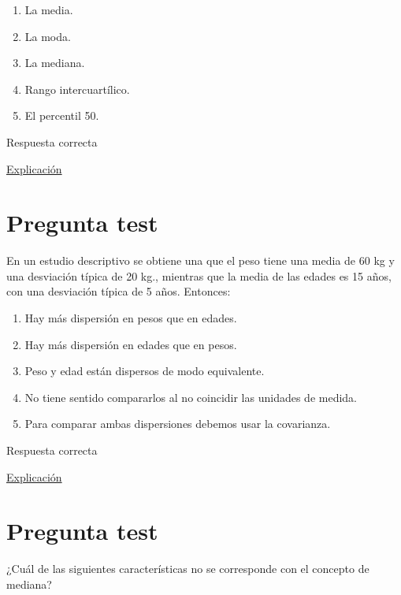 \documentclass[
]{book}
\providecommand{\tightlist}{%
  \setlength{\itemsep}{0pt}\setlength{\parskip}{0pt}}
\begin{document}
\begin{enumerate}
\def\labelenumi{\alph{enumi})}
\tightlist
\item
  La media.
\item
  La moda.
\item
  La mediana.
\item
  Rango intercuartílico.
\item
  El percentil 50.
\end{enumerate}

Respuesta correcta

\href{https://1fjmanzano.github.io/bioestadistica/medidas-de-posicio\%CC\%81n-dispersio\%CC\%81n-y-forma.html\#medidas-de-posicio\%CC\%81n-centrales}{Explicación}

\hypertarget{pregunta-test-52}{%
\section{Pregunta test}\label{pregunta-test-52}}

En un estudio descriptivo se obtiene una que el peso tiene una media de 60 kg y una desviación típica de 20 kg., mientras que la media de las edades es 15 años, con una desviación típica de 5 años. Entonces:

\begin{enumerate}
\def\labelenumi{\alph{enumi})}
\tightlist
\item
  Hay más dispersión en pesos que en edades.
\item
  Hay más dispersión en edades que en pesos.
\item
  Peso y edad están dispersos de modo equivalente.
\item
  No tiene sentido compararlos al no coincidir las unidades de medida.
\item
  Para comparar ambas dispersiones debemos usar la covarianza.
\end{enumerate}

Respuesta correcta

\href{https://1fjmanzano.github.io/bioestadistica/medidas-de-posicio\%CC\%81n-dispersio\%CC\%81n-y-forma.html}{Explicación}

\hypertarget{pregunta-test-53}{%
\section{Pregunta test}\label{pregunta-test-53}}

¿Cuál de las siguientes características no se corresponde con el concepto de mediana?
\end{document}
